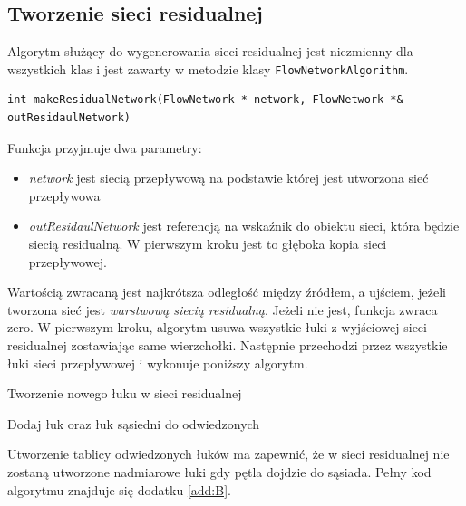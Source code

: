 \subsection{Tworzenie sieci residualnej}
Algorytm służący do wygenerowania sieci residualnej jest niezmienny dla wszystkich klas i jest zawarty w metodzie klasy \lstinline|FlowNetworkAlgorithm|.
\begin{verbatim}
int makeResidualNetwork(FlowNetwork * network, FlowNetwork *& outResidaulNetwork)
\end{verbatim}
Funkcja przyjmuje dwa parametry:
\begin{itemize}
	\item \emph{network} jest siecią przepływową na podstawie której jest utworzona sieć przepływowa
	\item \emph{outResidaulNetwork} jest referencją na wskaźnik do obiektu sieci, która będzie siecią residualną. W pierwszym kroku jest to głęboka kopia sieci przepływowej.
\end{itemize}
Wartością zwracaną jest najkrótsza odległość między źródłem, a ujściem, jeżeli tworzona sieć jest \textit{warstwową siecią residualną}. Jeżeli nie jest, funkcja zwraca zero. W pierwszym kroku, algorytm usuwa wszystkie łuki z wyjściowej sieci residualnej zostawiając same wierzchołki. Następnie przechodzi przez wszystkie łuki sieci przepływowej i wykonuje poniższy algorytm.
\begin{algorithm}
	\caption{Tworzenie nowego łuku w sieci residualnej}\label{siecResidualnaPseudo}
	\begin{algorithmic}
				\State Dodaj łuk oraz łuk sąsiedni do odwiedzonych
			\EndIf
			\EndIf
			\EndIf
		\EndProcedure
	\end{algorithmic}
\end{algorithm}
Utworzenie tablicy odwiedzonych łuków ma zapewnić, że w sieci residualnej nie zostaną utworzone nadmiarowe łuki gdy pętla dojdzie do sąsiada. Pełny kod algorytmu znajduje się dodatku \ref{add:B}.
